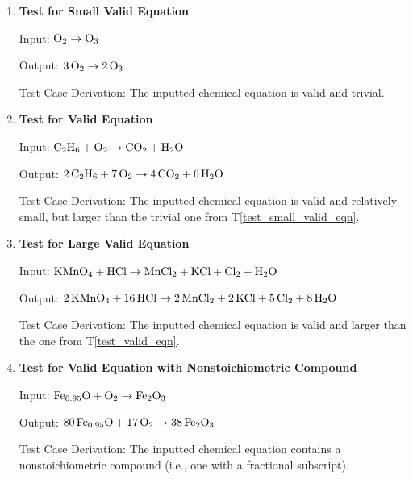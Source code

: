 \documentclass[12pt, titlepage]{article}
\newcounter{testnum} %
\newcommand{\testref}[1]{T\ref{#1}}
\begin{document}
\begin{enumerate}

  \item[T\refstepcounter{testnum}\thetestnum \label{test_small_valid_eqn}:]
    \textbf{Test for Small Valid Equation}

    Input: $\ce{O2} \rightarrow \ce{O3}$ \cite{fahey_twenty_2011}

    Output: $\ce{3O2} \rightarrow \ce{2O3}$ \cite[p.~6]{fahey_twenty_2011}

    Test Case Derivation: The inputted chemical equation is
    valid and trivial.

    \newpage

  \item[T\refstepcounter{testnum}\thetestnum \label{test_valid_eqn}:]
    \textbf{Test for Valid Equation}

    Input: $\ce{C2H6} + \ce{O2} \rightarrow \ce{CO2} + \ce{H2O}$
    \cite{hamid_balancing_2019}

    Output: $\ce{2C2H6} + \ce{7O2} \rightarrow \ce{4CO2} + \ce{6H2O}$
    \cite[p.~523]{hamid_balancing_2019}

    Test Case Derivation: The inputted chemical equation is valid and
    relatively small, but larger than the trivial one from
    \testref{test_small_valid_eqn}.

  \item[T\refstepcounter{testnum}\thetestnum \label{test_large_valid_eqn}:]
    \textbf{Test for Large Valid Equation}

    Input: $\ce{KMnO4} + \ce{HCl} \rightarrow \ce{MnCl2} + \ce{KCl} +
      \ce{Cl2} + \ce{H2O}$ \cite{taylor_balancing_2021}

    Output: $\ce{2KMnO4} + \ce{16HCl} \rightarrow \ce{2MnCl2} + \ce{2KCl} +
      \ce{5Cl2} + \ce{8H2O}$ \cite{taylor_balancing_2021}

    Test Case Derivation: The inputted chemical equation is
    valid and larger than the one from \testref{test_valid_eqn}.

  \item[T\refstepcounter{testnum}\thetestnum \label{test_nonstoich_valid_eqn}:]
    \textbf{Test for Valid Equation with Nonstoichiometric Compound}

    Input: $\ce{Fe_{0.95}O} + \ce{O2} \rightarrow \ce{Fe2O3}$
    \cite{doubtnut_when_nodate}

    Output: $\ce{80Fe_{0.95}O} + \ce{17O2} \rightarrow \ce{38Fe2O3}$

    Test Case Derivation: The inputted chemical equation contains a
    nonstoichiometric compound (i.e., one with a fractional subscript).

\end{enumerate}
\end{document}
